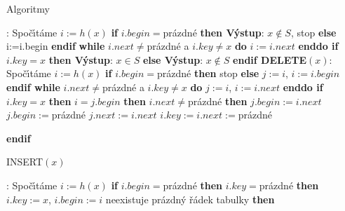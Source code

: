 \subhead
Algoritmy
\endsubhead
\smallskip

:\newline 
Spo\v c\'\i t\'ame $i:=h(x)$\newline 
{\bf if} $i.begin=$pr\'azdn\'e {\bf then V\'ystup}: $x\notin S$, stop {\bf else} i:=i.begin {\bf endif}\newline 
{\bf while} $i.next\ne$pr\'azdn\'e a $i.key\ne x$ {\bf do} $i:=i.next$ {\bf enddo \newline 
if} $i.key=x$ {\bf then V\'ystup}: $x\in S$ {\bf else V\'ystup}: $
x\notin S$ {\bf endif
\medskip
\flushpar DELETE$(x)$}:\newline 
Spo\v c\'\i t\'ame $i:=h(x)$\newline 
{\bf if} $i.begin=$pr\'azdn\'e {\bf then} stop {\bf else} $j:=i$, $
i:=i.begin$ {\bf endif\newline 
while} $i.next\ne$pr\'azdn\'e a $i.key\ne x$ {\bf do} $j:=i$, $i:=i.next$ {\bf enddo \newline 
if} $i.key=x$ {\bf then}\newline 
\phantom{---}{\bf if} $i=j.begin$ {\bf then}\newline 
\phantom{------}{\bf if} $i.next\ne$pr\'azdn\'e {\bf then}\newline 
\phantom{---------}$j.begin:=i.next$\newline 
\phantom{------}{\bf else}\newline 
\phantom{---------}$j.begin:=$pr\'azdn\'e\newline 
\phantom{------}{\bf endif}\newline 
\phantom{---}{\bf else}\newline 
\phantom{------}$j.next:=i.next$\newline 
\phantom{---}{\bf endif}\newline 
\phantom{---}$i.key:=i.next:=$pr\'azdn\'e\newline
{\bf endif
\medskip

\flushpar INSERT$(x)$}:\newline 
Spo\v c\'\i t\'ame $i:=h(x)$\newline
{\bf if} $i.begin=$pr\'azdn\'e {\bf then}\newline
\phantom{---}{\bf if} $i.key=$pr\'azdn\'e {\bf then}\newline 
\phantom{------}$i.key:=x$, $i.begin:=i$\newline 
\phantom{---}{\bf else}\newline 
\phantom{------}{\bf if} neexistuje pr\'azdn\'y \v r\'adek tabulky {\bf then}\newline 
